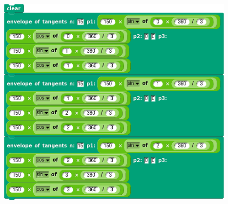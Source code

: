 \documentclass[noauthor,nooutcomes,12pt,hints,handout]{ximera}
\begin{document}
\begin{question}
\begin{freeResponse}
\begin{center}
    \includegraphics[width=.3\textwidth]{triEnvScript.png}\qquad{}
  \end{center}
  \end{freeResponse}
\end{question}

\mynewpage
\end{document}
